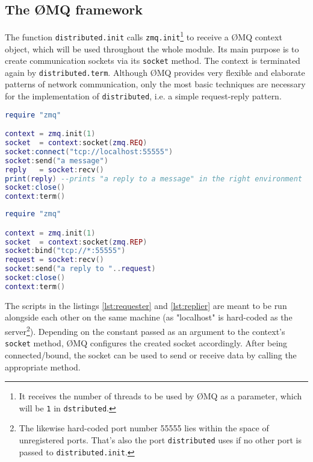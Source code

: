 \subsection{The \O MQ framework}
\label{sec:messages:zeromq}

The function \texttt{distributed.init} calls \texttt{zmq.init}\footnote{It receives the number of threads to be used by \O MQ as a parameter, which will be \texttt{1} in \texttt{dstributed}.} to receive a \O MQ context object, which will be used throughout the whole module. Its main purpose is to create communication sockets via its \texttt{socket} method. The context is terminated again by \texttt{distributed.term}. Although \O MQ provides very flexible and elaborate patterns of network communication, only the most basic techniques are necessary for the implementation of \texttt{distributed}, i.e. a simple request-reply pattern.

\begin{lstlisting}[language=lua, caption={Example of the \emph{request} side of a communication via \O MQ}, label=lst:requester, name=lst:requester]
require "zmq"

context = zmq.init(1)
socket  = context:socket(zmq.REQ)
socket:connect("tcp://localhost:55555")
socket:send("a message")
reply   = socket:recv()
print(reply) --prints "a reply to a message" in the right environment
socket:close()
context:term()
\end{lstlisting}

\begin{lstlisting}[language=lua, caption={Example of the \emph{reply} side of a communication via \O MQ}, label=lst:replier, name=lst:repler]
require "zmq"

context = zmq.init(1)
socket  = context:socket(zmq.REP)
socket:bind("tcp://*:55555")
request = socket:recv()
socket:send("a reply to "..request)
socket:close()
context:term()
\end{lstlisting}

The scripts in the listings \ref{lst:requester} and \ref{lst:replier} are meant to be run alongside each other on the same machine (as "localhost" is hard-coded as the server\footnote{The likewise hard-coded port number 55555 lies within the space of unregistered ports. That's also the port \texttt{distributed} uses if no other port is passed to \texttt{distributed.init}.}). Depending on the constant passed as an argument to the context's \texttt{socket} method, \O MQ configures the created socket accordingly. After being connected/bound, the socket can be used to send or receive data by calling the appropriate method.

